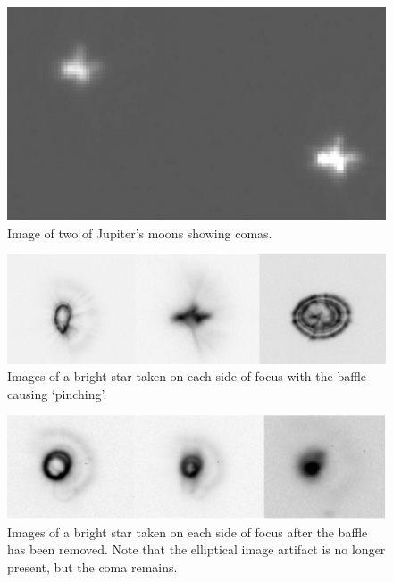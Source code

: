 \documentclass[a4paper,fleqn,usenatbib]{mnras}
\begin{document}
\begin{figure}
	\includegraphics[width=\columnwidth]{images/comas.png}
    \caption{Image of two of Jupiter's moons showing comas.}
    \label{fig:coma}
\end{figure}

\begin{figure}
	\includegraphics[width=\columnwidth]{images/ellipse.png}
    \caption{Images of a bright star taken on each side of focus with the baffle causing `pinching'.}
    \label{fig:ellipse}
\end{figure}

\begin{figure}
	\includegraphics[width=\columnwidth]{images/ellipse-corrected.png}
    \caption{Images of a bright star taken on each side of focus after the baffle has been removed. Note that the elliptical image artifact is no longer present, but the coma remains.}
    \label{fig:ellipse-corrected}
\end{figure}
\end{document}
